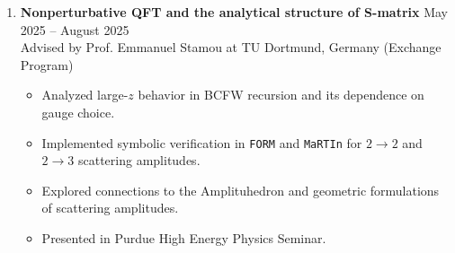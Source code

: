 \documentclass[11pt,letterpaper]{article}
\begin{document}
\begin{enumerate}[leftmargin=*,label=\arabic*.]
        \item \textbf{Nonperturbative QFT and the analytical structure of S-matrix}
        \hfill May 2025 -- August 2025
    \\Advised by Prof. Emmanuel Stamou at TU Dortmund, Germany (Exchange Program)
    \begin{itemize}
    \item Analyzed large-$z$ behavior in BCFW recursion and its dependence on gauge choice.  
    \item Implemented symbolic verification in \texttt{FORM} and \texttt{MaRTIn} for $2{\to}2$ and $2{\to}3$ scattering amplitudes.  
    \item Explored connections to the Amplituhedron and geometric formulations of scattering amplitudes.
    \item Presented in {Purdue High Energy Physics Seminar}.
    \end{itemize}
\end{enumerate}
\end{document}
